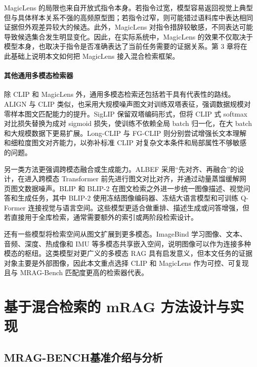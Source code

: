 MagicLens 的局限也来自开放式指令本身。若指令过宽，模型容易返回视觉上典型但与具体样本关系不强的高频原型图；若指令过窄，则可能错过语料库中表达相同证据但外观差异较大的候选。此外，MagicLens 对指令措辞较敏感，不同表达可能导致候选集合发生明显变化。因此，在实际系统中，MagicLens 的效果不仅取决于模型本身，也取决于指令是否准确表达了当前任务需要的证据关系。第 3 章将在此基础上说明本文如何把 MagicLens 接入混合检索框架。

\subsubsection{其他通用多模态检索器}

除 CLIP 和 MagicLens 外，通用多模态检索还包括若干具有代表性的路线。ALIGN 与 CLIP 类似，也采用大规模噪声图文对训练双塔表征，强调数据规模对零样本图文匹配能力的提升\cite{gomez2021align}。SigLIP 保留双塔编码形式，但将 CLIP 式 softmax 对比损失替换为成对 sigmoid 损失，使训练不依赖全局 batch 归一化，在大 batch 和大规模数据下更易扩展\cite{zhai2023siglip}。Long-CLIP 与 FG-CLIP 则分别尝试增强长文本理解和细粒度图文对齐能力，以弥补标准 CLIP 对复杂文本条件和局部属性不够敏感的问题\cite{zhang2024longclip,xie2025fgclip}。

另一类方法更强调跨模态融合或生成能力。ALBEF 采用“先对齐、再融合”的设计，在进入跨模态 Transformer 前先进行图文对比对齐，并通过动量蒸馏缓解网页图文数据噪声\cite{li2021albef}。BLIP 和 BLIP-2 在图文检索之外进一步统一图像描述、视觉问答和生成任务，其中 BLIP-2 使用冻结图像编码器、冻结大语言模型和可训练 Q-Former 连接视觉与语言空间\cite{li2022blip,li2023blip2}。这些模型更适合做重排、描述生成或问答增强，但若直接用于全库检索，通常需要额外的索引或两阶段检索设计。

还有一些模型将检索空间从图文扩展到更多模态。ImageBind 学习图像、文本、音频、深度、热成像和 IMU 等多模态共享嵌入空间，说明图像可以作为连接多种模态的枢纽\cite{girdhar2023imagebind}。这类模型对更广义的多模态 RAG 具有启发意义，但本文任务的证据对象主要是外部图像，因此本文重点选择 CLIP 和 MagicLens 作为可控、可复现且与 MRAG-Bench 匹配度更高的检索器代表。

\chapter{基于混合检索的 mRAG 方法设计与实现}

\section{MRAG-BENCH基准介绍与分析}

